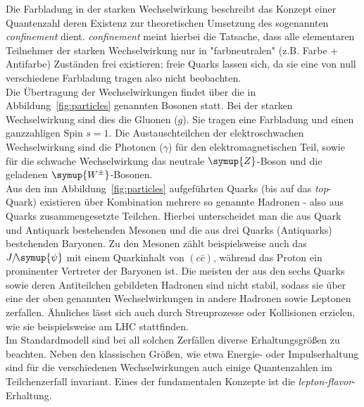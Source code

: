 Die Farbladung in der starken Wechselwirkung beschreibt das Konzept einer Quantenzahl deren Existenz zur theoretischen Umsetzung des sogenannten \textit{confinement} dient. \textit{confinement} meint hierbei die Tatsache, dass alle elementaren Teilnehmer der starken Wechselwirkung nur in "farbneutralen" (z.B. Farbe + Antifarbe) Zuständen frei existieren; freie Quarks lassen sich, da sie eine von null verschiedene Farbladung tragen also nicht beobachten.\\
%
Die Übertragung der Wechselwirkungen findet über die in Abbildung~\ref{fig:particles} genannten Bosonen statt. Bei der starken Wechselwirkung sind dies die Gluonen ($g$). Sie tragen eine Farbladung und einen ganzzahligen Spin $s=1$. Die Austauschteilchen der elektroschwachen Wechselwirkung sind die Photonen ($\gamma$) für den elektromagnetischen Teil, sowie für die schwache Wechselwirkung das neutrale $\symup{Z}$-Boson und die geladenen $\symup{W^{\pm}}$-Bosonen. \\
%
Aus den inn Abbildung~\ref{fig:particles} aufgeführten Quarks (bis auf das \textit{top}-Quark) existieren über Kombination mehrere so genannte Hadronen - also aus Quarks zusammengesetzte Teilchen. Hierbei unterscheidet man die aus Quark und Antiquark bestehenden Mesonen und die aus drei Quarks (Antiquarks) bestehenden Baryonen. Zu den Mesonen zählt beispielsweise auch das $J/\!\symup{\psi}$ mit einem Quarkinhalt von $(c\bar{c})$, während das Proton ein prominenter Vertreter der Baryonen ist. Die meisten der aus den sechs Quarks sowie deren Antiteilchen gebildeten Hadronen sind nicht stabil, sodass sie über eine der oben genannten Wechselwirkungen in andere Hadronen sowie Leptonen zerfallen. Ähnliches lässt sich auch durch Streuprozesse oder Kollisionen erzielen, wie sie beispielsweise am LHC stattfinden.\\
%
Im Standardmodell sind bei all solchen Zerfällen diverse Erhaltungsgrößen zu beachten. Neben den klassischen Größen, wie etwa Energie- oder Impulserhaltung sind für die verschiedenen Wechselwirkungen auch einige Quantenzahlen im Teilchenzerfall invariant. Eines der fundamentalen Konzepte ist die \textit{lepton-flavor}-Erhaltung.
%
